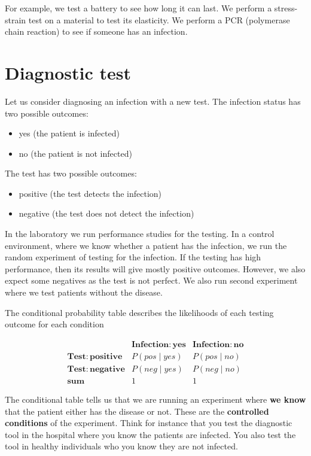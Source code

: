 \documentclass[
]{book}
\providecommand{\tightlist}{%
  \setlength{\itemsep}{0pt}\setlength{\parskip}{0pt}}
\begin{document}
For example, we test a battery to see how long it can last. We perform a stress-strain test on a material to test its elasticity. We perform a PCR (polymerase chain reaction) to see if someone has an infection.

\hypertarget{diagnostic-test}{%
\section{Diagnostic test}\label{diagnostic-test}}

Let us consider diagnosing an infection with a new test. The infection status has two possible outcomes:

\begin{itemize}
\tightlist
\item
  yes (the patient is infected)
\item
  no (the patient is not infected)
\end{itemize}

The test has two possible outcomes:

\begin{itemize}
\tightlist
\item
  positive (the test detects the infection)
\item
  negative (the test does not detect the infection)
\end{itemize}

In the laboratory we run performance studies for the testing. In a control environment, where we know whether a patient has the infection, we run the random experiment of testing for the infection. If the testing has high performance, then its results will give mostly positive outcomes. However, we also expect some negatives as the test is not perfect. We also run second experiment where we test patients without the disease.

The conditional probability table describes the likelihoods of each testing outcome for each condition

\[
\begin{array}{cc|c}
    & \mathbf{Infection: yes} & \mathbf{Infection: no} \\ 
    \mathbf{Test: positive} & P(pos \mid yes) & P(pos \mid no) \\ 
    \mathbf{Test: negative} & P(neg \mid yes) & P(neg \mid no) \\ 
    \mathbf{sum} & 1 & 1
\end{array}
\]

The conditional table tells us that we are running an experiment where \textbf{we know} that the patient either has the disease or not. These are the \textbf{controlled conditions} of the experiment. Think for instance that you test the diagnostic tool in the hospital where you know the patients are infected. You also test the tool in healthy individuals who you know they are not infected.
\end{document}
